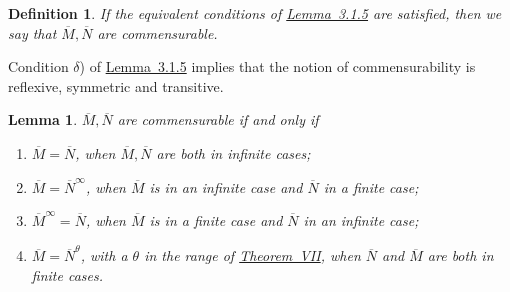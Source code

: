 \documentclass[b5paper,twoside]{article}
\newcommand{\thmref}[2]{\hyperref[#1]{\mbox{Theorem~#2}}}
\newcommand{\lemref}[2]{\hyperref[#1]{\mbox{Lemma~#2}}}
\theoremstyle{mvnplain}
\newtheorem{lemma}{Lemma}[section]
\newtheorem{definition}{Definition}[section]
\newcommand{\M}{\mathbf M}
\newcommand{\N}{\mathbf N}
\def\M{M}%
\def\N{N}%
\begin{document}
\begin{definition}\label{def:3.1.2}
If the equivalent conditions of \lemref{lem:3.1.5}{3.1.5} are satisfied, then
we say that \(\overline{\M},\overline{\N}\) are \emph{commensurable}.
\end{definition}

Condition \(\delta\)) of \lemref{lem:3.1.5}{3.1.5} implies that the notion of
commensurability is reflexive, symmetric and transitive.

\begin{lemma}\label{lem:3.1.6}
\(\overline{\M},\overline{\N}\) are commensurable if and only if
\begin{enumerate}[label={}]
\item[\(\alpha\))] \(\overline{\M}=\overline{\N}\), when \(\overline{\M},\overline{\N}\)
are both in infinite cases;
\item[\(\beta\))] \(\overline{\M}=\overline{\N}^{\infty}\), when \(\overline{\M}\) is
in an infinite case and \(\overline{\N}\) in a finite case;
\item[\(\gamma\))] \(\overline{\M}^{\infty}=\overline{\N}\), when \(\overline{\M}\) is
in a finite case and \(\overline{\N}\) in an infinite case;
\item[\(\delta\))] \(\overline{\M}=\overline{\N}^{\theta}\), with a \(\theta\) in the
range of \thmref{thm:VII}{VII}, when \(\overline{\N}\) and
\(\overline{\M}\) are both in finite cases.
\end{enumerate}
\end{lemma}
\end{document}
